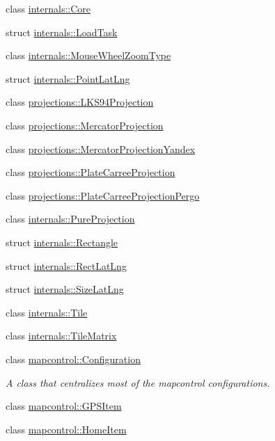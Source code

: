 \begin{DoxyCompactItemize}
class \hyperlink{classinternals_1_1_core}{internals\-::\-Core}
\item 
struct \hyperlink{structinternals_1_1_load_task}{internals\-::\-Load\-Task}
\item 
class \hyperlink{classinternals_1_1_mouse_wheel_zoom_type}{internals\-::\-Mouse\-Wheel\-Zoom\-Type}
\item 
struct \hyperlink{structinternals_1_1_point_lat_lng}{internals\-::\-Point\-Lat\-Lng}
\item 
class \hyperlink{classprojections_1_1_l_k_s94_projection}{projections\-::\-L\-K\-S94\-Projection}
\item 
class \hyperlink{classprojections_1_1_mercator_projection}{projections\-::\-Mercator\-Projection}
\item 
class \hyperlink{classprojections_1_1_mercator_projection_yandex}{projections\-::\-Mercator\-Projection\-Yandex}
\item 
class \hyperlink{classprojections_1_1_plate_carree_projection}{projections\-::\-Plate\-Carree\-Projection}
\item 
class \hyperlink{classprojections_1_1_plate_carree_projection_pergo}{projections\-::\-Plate\-Carree\-Projection\-Pergo}
\item 
class \hyperlink{classinternals_1_1_pure_projection}{internals\-::\-Pure\-Projection}
\item 
struct \hyperlink{structinternals_1_1_rectangle}{internals\-::\-Rectangle}
\item 
struct \hyperlink{structinternals_1_1_rect_lat_lng}{internals\-::\-Rect\-Lat\-Lng}
\item 
struct \hyperlink{structinternals_1_1_size_lat_lng}{internals\-::\-Size\-Lat\-Lng}
\item 
class \hyperlink{classinternals_1_1_tile}{internals\-::\-Tile}
\item 
class \hyperlink{classinternals_1_1_tile_matrix}{internals\-::\-Tile\-Matrix}
\item 
class \hyperlink{classmapcontrol_1_1_configuration}{mapcontrol\-::\-Configuration}
\begin{DoxyCompactList}\small\item\em A class that centralizes most of the mapcontrol configurations. \end{DoxyCompactList}\item 
class \hyperlink{classmapcontrol_1_1_g_p_s_item}{mapcontrol\-::\-G\-P\-S\-Item}
\item 
class \hyperlink{classmapcontrol_1_1_home_item}{mapcontrol\-::\-Home\-Item}

\end{DoxyCompactItemize}
